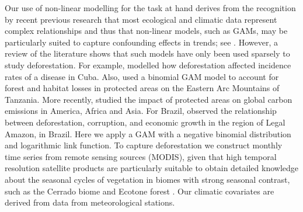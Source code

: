 Our use of non-linear modelling for the task at hand derives from the recognition by recent previous research that most ecological and climatic data represent complex relationships and thus that non-linear models, such as GAMs, may be particularly suited to capture confounding effects in trends; see \citep{alkemad_1998,BELL_2015,JOYE_2015,LUSK_2016,SADAT_2016,HALPERIN_2016, SANTOS_2017,TAPIA_2017, LIU_2018,MORENO_2018}. However, a review of the literature shows that such models have only been used sparsely to study deforestation. For example, \citet{COHEN_2008} modelled how deforestation affected incidence rates of a disease in Cuba. Also, \citet{GREEN_2013} used a binomial GAM model to account for forest and habitat losses in protected areas on the Eastern Arc Mountains of Tanzania. More recently, \citet{BEBBER_2017} studied the impact of protected areas on global carbon emissions in America, Africa and Asia. For Brazil, \citet{MENDES_2012} observed the relationship between deforestation, corruption, and economic growth in the region of Legal Amazon, in Brazil. Here we apply a GAM with a negative binomial distribution and logarithmic link function. To capture deforestation we construct monthly time series from remote sensing sources (MODIS), given that high temporal resolution satellite products are particularly suitable to obtain detailed knowledge about the seasonal cycles of vegetation in biomes with strong seasonal contrast, such as the Cerrado biome and Ecotone forest \citep{bayma_sano_2015}. Our climatic covariates are derived from data from meteorological stations. 



